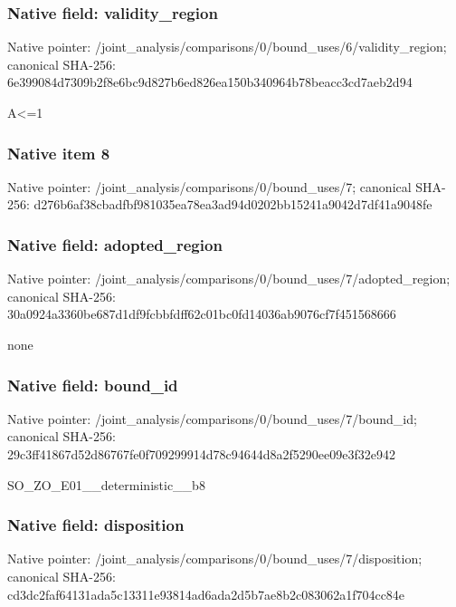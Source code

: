 \documentclass[10pt,a4paper]{article}
\begin{document}
\subsubsection{Native field: validity\_\allowbreak{}region}
Native pointer: /joint\_\allowbreak{}analysis/comparisons/0/bound\_\allowbreak{}uses/6/validity\_\allowbreak{}region; canonical SHA-256: 6e399084d7309b2f8e6bc9d827b6ed826ea150b340964b78beacc3cd7aeb2d94

\begingroup\raggedright\sloppy A<=\allowbreak{}1\par\endgroup

\subsubsection{Native item 8}
Native pointer: /joint\_\allowbreak{}analysis/comparisons/0/bound\_\allowbreak{}uses/7; canonical SHA-256: d276b6af38cbadfbf981035ea78ea3ad94d0202bb15241a9042d7df41a9048fe

\subsubsection{Native field: adopted\_\allowbreak{}region}
Native pointer: /joint\_\allowbreak{}analysis/comparisons/0/bound\_\allowbreak{}uses/7/adopted\_\allowbreak{}region; canonical SHA-256: 30a0924a3360be687d1df9fcbbfdff62c01bc0fd14036ab9076cf7f451568666

\begingroup\raggedright\sloppy none\par\endgroup

\subsubsection{Native field: bound\_\allowbreak{}id}
Native pointer: /joint\_\allowbreak{}analysis/comparisons/0/bound\_\allowbreak{}uses/7/bound\_\allowbreak{}id; canonical SHA-256: 29c3ff41867d52d86767fe0f709299914d78c94644d8a2f5290ee09e3f32e942

\begingroup\raggedright\sloppy SO\_\allowbreak{}ZO\_\allowbreak{}E01\_\allowbreak{}\_\allowbreak{}deterministic\_\allowbreak{}\_\allowbreak{}b8\par\endgroup

\subsubsection{Native field: disposition}
Native pointer: /joint\_\allowbreak{}analysis/comparisons/0/bound\_\allowbreak{}uses/7/disposition; canonical SHA-256: cd3dc2faf64131ada5c13311e93814ad6ada2d5b7ae8b2c083062a1f704cc84e
\end{document}
